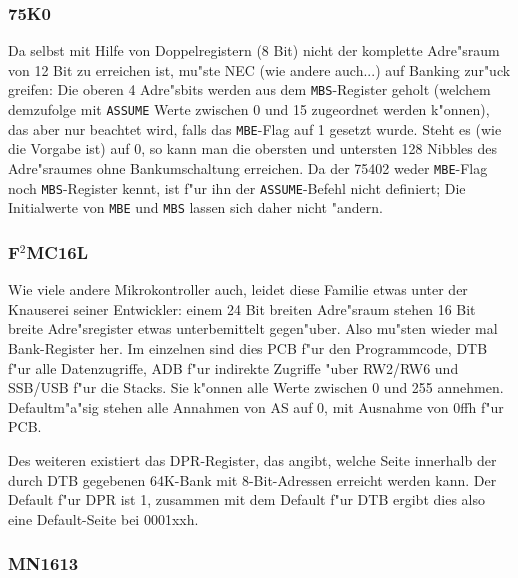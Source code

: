 \documentclass[12pt,a4paper,twoside]{report}
\newcommand{\tty}[1]{{\tt #1}}
\begin{document}

\subsubsection{75K0}

Da selbst mit Hilfe von Doppelregistern (8 Bit) nicht der komplette
Adre"sraum von 12 Bit zu erreichen ist, mu"ste NEC (wie andere auch...)
auf Banking zur"uck greifen: Die oberen 4 Adre"sbits werden aus dem
\tty{MBS}-Register geholt (welchem demzufolge mit \tty{ASSUME} Werte
zwischen 0 und 15 zugeordnet werden k"onnen), das aber nur beachtet
wird, falls das \tty{MBE}-Flag auf 1 gesetzt wurde.  Steht es (wie
die Vorgabe ist) auf 0, so kann man die obersten und untersten 128
Nibbles des Adre"sraumes ohne Bankumschaltung erreichen.  Da der 75402
weder \tty{MBE}-Flag noch \tty{MBS}-Register kennt, ist f"ur ihn der
\tty{ASSUME}-Befehl nicht definiert; Die Initialwerte von \tty{MBE} und
\tty{MBS} lassen sich daher nicht "andern.


\subsubsection{F$^2$MC16L}

Wie viele andere Mikrokontroller auch, leidet diese Familie etwas unter
der Knauserei seiner Entwickler: einem 24 Bit breiten Adre"sraum stehen 16
Bit breite Adre"sregister etwas unterbemittelt gegen"uber.  Also mu"sten
wieder mal Bank-Register her.  Im einzelnen sind dies PCB f"ur den
Programmcode, DTB f"ur alle Datenzugriffe, ADB f"ur indirekte Zugriffe
"uber RW2/RW6 und SSB/USB f"ur die Stacks.  Sie k"onnen alle Werte
zwischen 0 und 255 annehmen.  Defaultm"a"sig stehen alle Annahmen von AS
auf 0, mit Ausnahme von 0ffh f"ur PCB.

Des weiteren existiert das DPR-Register, das angibt, welche Seite
innerhalb der durch DTB gegebenen 64K-Bank mit 8-Bit-Adressen erreicht
werden kann.  Der Default f"ur DPR ist 1, zusammen mit dem Default f"ur
DTB ergibt dies also eine Default-Seite bei 0001xxh.


\subsubsection{MN1613}
\end{document}
